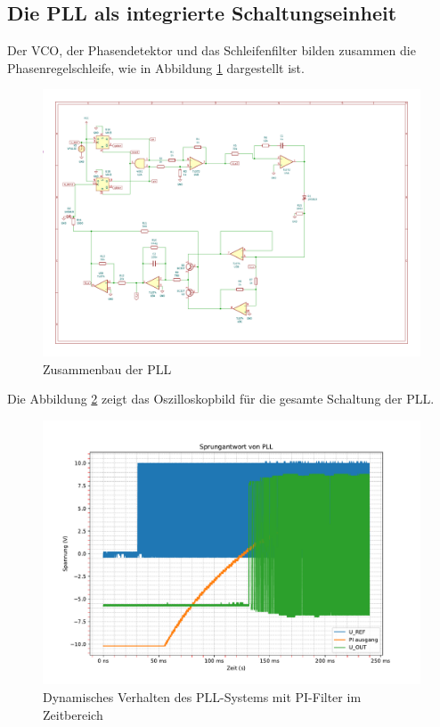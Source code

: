 \subsection{Die PLL als integrierte Schaltungseinheit}

Der VCO, der Phasendetektor und das Schleifenfilter bilden zusammen die Phasenregelschleife, wie in Abbildung \ref{fig:PLL_KiCad} dargestellt ist.

\begin{figure}[H]
  \centering
  \includegraphics[width=0.8\linewidth]{Elektronik-Laborprotokoll_PLL/Abbildungen/PLL_KiCad.pdf}
  \caption{Zusammenbau der PLL}
  \label{fig:PLL_KiCad}
\end{figure}

Die Abbildung \ref{fig:spa_ges} zeigt das Oszilloskopbild für die gesamte Schaltung der PLL.

\begin{figure}[H]
  \centering
  \includegraphics[width=1\linewidth]{Elektronik-Laborprotokoll_PLL/Abbildungen/sprungantwort_gesamt.pdf}
  \caption{Dynamisches Verhalten des PLL-Systems mit PI-Filter im Zeitbereich}
  \label{fig:spa_ges}
\end{figure}

